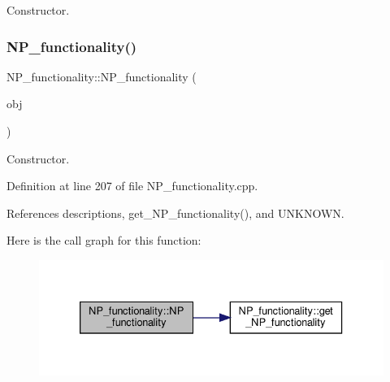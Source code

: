 Constructor. 

\mbox{\label{classNP__functionality_a289c00958ea59e11a4d6d02758fa1a86}} 
\subsubsection{\texorpdfstring{N\+P\+\_\+functionality()}{NP\_functionality()}\hspace{0.1cm}{\footnotesize\ttfamily [2/2]}}
{\footnotesize\ttfamily N\+P\+\_\+functionality\+::\+N\+P\+\_\+functionality (\begin{DoxyParamCaption}\item[{const \hyperlink{NP__functionality_8hpp_aacd74315d343c1054cd3c01e18627049}{N\+P\+\_\+functionality\+Ref} \&}]{obj }\end{DoxyParamCaption})\hspace{0.3cm}{\ttfamily [explicit]}}



Constructor. 



Definition at line 207 of file N\+P\+\_\+functionality.\+cpp.



References descriptions, get\+\_\+\+N\+P\+\_\+functionality(), and U\+N\+K\+N\+O\+WN.

Here is the call graph for this function\+:
\nopagebreak
\begin{figure}[H]
\begin{center}
\leavevmode
\includegraphics[width=333pt]{d8/dda/classNP__functionality_a289c00958ea59e11a4d6d02758fa1a86_cgraph}
\end{center}
\end{figure}
\mbox{\label{classNP__functionality_a85fbdf19898fd49b58d9bd288a3b3d1f}} 
